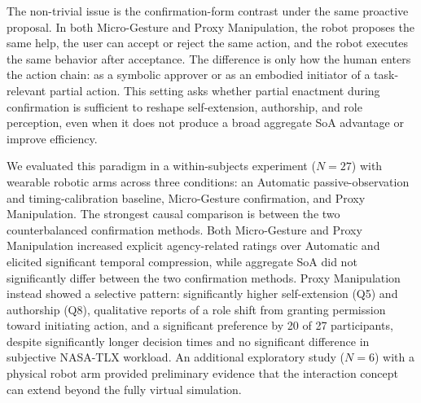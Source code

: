 \documentclass[sigconf,review,anonymous]{acmart}
\begin{document}
The non-trivial issue is the confirmation-form contrast under the same proactive proposal. In both Micro-Gesture and Proxy Manipulation, the robot proposes the same help, the user can accept or reject the same action, and the robot executes the same behavior after acceptance. The difference is only how the human enters the action chain: as a symbolic approver or as an embodied initiator of a task-relevant partial action. This setting asks whether partial enactment during confirmation is sufficient to reshape self-extension, authorship, and role perception, even when it does not produce a broad aggregate SoA advantage or improve efficiency.

We evaluated this paradigm in a within-subjects experiment ($N=27$) with wearable robotic arms across three conditions: an Automatic passive-observation and timing-calibration baseline, Micro-Gesture confirmation, and Proxy Manipulation. The strongest causal comparison is between the two counterbalanced confirmation methods. Both Micro-Gesture and Proxy Manipulation increased explicit agency-related ratings over Automatic and elicited significant temporal compression, while aggregate SoA did not significantly differ between the two confirmation methods. Proxy Manipulation instead showed a selective pattern: significantly higher self-extension (Q5) and authorship (Q8), qualitative reports of a role shift from granting permission toward initiating action, and a significant preference by 20 of 27 participants, despite significantly longer decision times and no significant difference in subjective NASA-TLX workload. An additional exploratory study ($N=6$) with a physical robot arm provided preliminary evidence that the interaction concept can extend beyond the fully virtual simulation.
\end{document}
